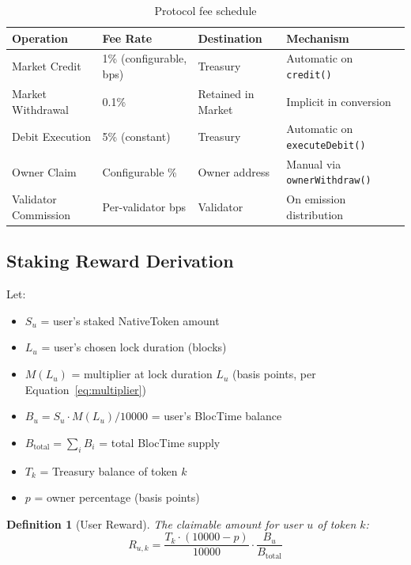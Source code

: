 \documentclass[11pt,a4paper]{article}
\newtheorem{definition}{Definition}[section]
\begin{document}
\begin{table}[H]
\centering
\begin{tabular}{llll}
\toprule
\textbf{Operation} & \textbf{Fee Rate} & \textbf{Destination} & \textbf{Mechanism} \\
\midrule
Market Credit & 1\% (configurable, bps) & Treasury & Automatic on \texttt{credit()} \\
Market Withdrawal & 0.1\% & Retained in Market & Implicit in conversion \\
Debit Execution & 5\% (constant) & Treasury & Automatic on \texttt{executeDebit()} \\
Owner Claim & Configurable \% & Owner address & Manual via \texttt{ownerWithdraw()} \\
Validator Commission & Per-validator bps & Validator & On emission distribution \\
\bottomrule
\end{tabular}
\caption{Protocol fee schedule}
\end{table}

\subsection{Staking Reward Derivation}

Let:
\begin{itemize}
    \item $S_u$ = user's staked NativeToken amount
    \item $L_u$ = user's chosen lock duration (blocks)
    \item $M(L_u)$ = multiplier at lock duration $L_u$ (basis points, per Equation~\ref{eq:multiplier})
    \item $B_u = S_u \cdot M(L_u) / 10000$ = user's BlocTime balance
    \item $B_{\text{total}} = \sum_{i} B_i$ = total BlocTime supply
    \item $T_k$ = Treasury balance of token $k$
    \item $p$ = owner percentage (basis points)
\end{itemize}

\begin{definition}[User Reward]
The claimable amount for user $u$ of token $k$:
\begin{equation}
R_{u,k} = \frac{T_k \cdot (10000 - p)}{10000} \cdot \frac{B_u}{B_{\text{total}}}
\label{eq:reward}
\end{equation}
\end{definition}
\end{document}

